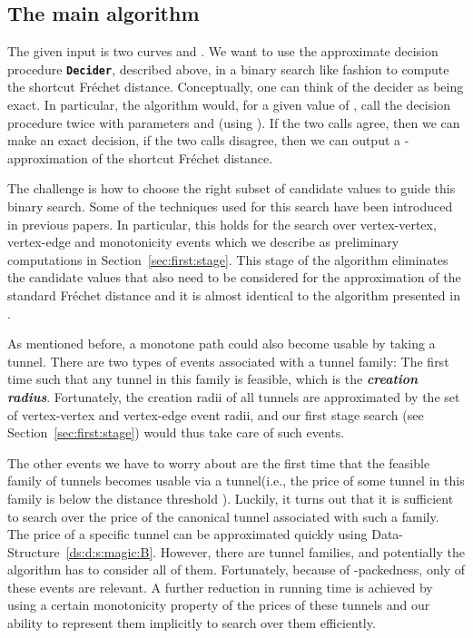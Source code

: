 \documentclass[12pt]{article}
\makeatletter
\newcommand{\AlgorithmI}[1]{{\textcolor[named]{RedViolet}{\texttt{\bf{#1}}}}}
\newcommand{\Algorithm}[1]{{\AlgorithmI{#1}\index{algorithm!#1@{\AlgorithmI{#1}}}}}
\newcommand{\seclab}[1]{\label{sec:#1}}
\newcommand{\secref}[1]{Section~\ref{sec:#1}}
\newcommand{\dsref}[1]{Data-Structure~\ref{ds:#1}}
\newcommand{\emphic}[2]{\textcolor{blue25}{\textbf{\emph{#1}}}\index{#2}}
\newcommand{\emphi}[1]{\emphic{#1}{#1}}
\newcommand{\Frechet}{Fr\'{e}c{h}e{}t\xspace}\providecommand{\Arr}{\mathop{\mathrm{\EuScript{A}}}}
\newcommand{\DeciderFr}{\Algorithm{Decider}\xspace}
\newcommand{\tunnel}{tunnel\xspace}
\newcommand{\tunnels}{tunnels\xspace}
\numberwithin{figure}{section}
\numberwithin{equation}{section}
\makeatother
\begin{document}
\subsection{The main algorithm}
\seclab{algo:main}

The given input is two curves  and .  We want to use the
approximate decision procedure \DeciderFr, described above, in a
binary search like fashion to compute the shortcut \Frechet distance.
Conceptually, one can think of the decider as being exact. In
particular, the algorithm would, for a given value of , call
the decision procedure twice with parameters  and  (using ). If the two calls agree, then
we can make an exact decision, if the two calls disagree, then we can
output a -approximation of the shortcut \Frechet distance.


The challenge is how to choose the right subset of candidate values to
guide this binary search.  Some of the techniques used for this search
have been introduced in previous papers. In particular, this holds for
the search over vertex-vertex, vertex-edge and monotonicity events
which we describe as preliminary computations in \secref{first:stage}.
This stage of the algorithm eliminates the candidate values that also
need to be considered for the approximation of the standard \Frechet
distance and it is almost identical to the algorithm presented in
\cite{dhw-afdrc-12}.

As mentioned before, a monotone path could also become usable by
taking a tunnel.  There are two types of events associated with a
\tunnel family: The first time such that any \tunnel in this family is
feasible, which is the \emphi{creation radius}.  Fortunately, the
creation radii of all \tunnels are approximated by the set of
vertex-vertex and vertex-edge event radii, and our first stage search
(see \secref{first:stage}) would thus take care of such events.

The other events we have to worry about are the first time that the
feasible family of \tunnel{}s becomes usable via a \tunnel (i.e., the
price of some tunnel in this family is below the distance threshold
).  Luckily, it turns out that it is sufficient to search over
the price of the canonical \tunnel{} associated with such a family.
The price of a specific \tunnel can be approximated quickly using
\dsref{d:s:magic:B}.  However, there are  \tunnel
families, and potentially the algorithm has to consider all of them.
Fortunately, because of -packedness, only  of these events
are relevant.  A further reduction in running time is achieved by
using a certain monotonicity property of the prices of these
\tunnel{}s and our ability to represent them implicitly to search over
them efficiently.
\end{document}
